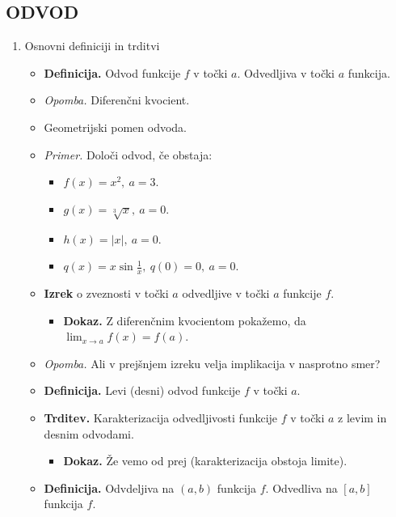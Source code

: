 \subsection{ODVOD}
\begin{enumerate}
    \item Osnovni definiciji in trditvi
    \begin{itemize}
        \item \colorbox{purple!30}{\textbf{Definicija.}} Odvod funkcije $f$ v točki $a$. Odvedljiva v točki $a$ funkcija.
        \item \colorbox{yellow!30}{\emph{Opomba.}} Diferenčni kvocient.
        \item Geometrijski pomen odvoda.
        \item \colorbox{yellow!30}{\emph{Primer.}} Določi odvod, če obstaja:
        \begin{itemize}
            \item $f(x) = x^2, \ a=3$.
            \item $g(x) = \sqrt[3]{x}, \ a = 0$.
            \item $h(x) = |x|, \ a = 0$.
            \item $q(x) = x \sin \frac{1}{x}, \ q(0) = 0, \ a = 0.$
        \end{itemize}
        \item \colorbox{blue!30}{\textbf{Izrek}} o zveznosti v točki $a$ odvedljive v točki $a$ funkcije $f$.
        \begin{itemize}
            \item \colorbox{green!30}{\textbf{Dokaz.}} Z diferenčnim kvocientom pokažemo, da $\lim_{x \to a} f(x) = f(a)$.
        \end{itemize}
        \item \colorbox{yellow!30}{\emph{Opomba.}} Ali v prejšnjem izreku velja implikacija v nasprotno smer?
        \item \colorbox{purple!30}{\textbf{Definicija.}} Levi (desni) odvod funkcije $f$ v točki $a$.
        \item \colorbox{blue!30}{\textbf{Trditev.}} Karakterizacija odvedljivosti funkcije $f$ v točki $a$ z levim in desnim odvodami.
        \begin{itemize}
            \item \colorbox{green!30}{\textbf{Dokaz.}} Že vemo od prej (karakterizacija obstoja limite).
        \end{itemize}
        \item \colorbox{purple!30}{\textbf{Definicija.}} Odvdeljiva na $(a,b)$ funkcija $f$. Odvedliva na $[a,b]$ funkcija $f$.

\end{itemize}
\end{enumerate}
